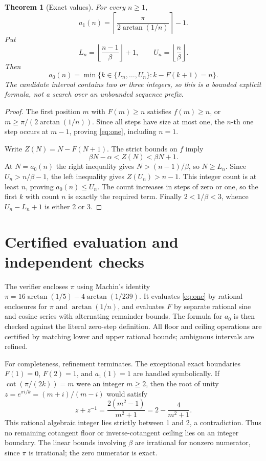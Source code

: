\documentclass[10pt]{article}
\newtheorem{theorem}{Theorem}
\begin{document}
\begin{theorem}[Exact values]\label{thm:exact}
For every $n\ge1$,
\begin{equation}\label{eq:one}
 a_1(n)=\left\lceil\frac\pi{2\arctan(1/n)}\right\rceil-1.
\end{equation}
Put
\[
 L_n=\left\lfloor\frac{n-1}{\beta}\right\rfloor+1,\qquad
 U_n=\left\lfloor\frac n\beta\right\rfloor.
\]
Then
\begin{equation}\label{eq:zero}
 a_0(n)=\min\{k\in\{L_n,\ldots,U_n\}:k-F(k+1)=n\}.
\end{equation}
The candidate interval contains two or three integers, so this is a bounded
explicit formula, not a search over an unbounded sequence prefix.
\end{theorem}
\begin{proof}
The first position $m$ with $F(m)\ge n$ satisfies
$f(m)\ge n$, or $m\ge\pi/(2\arctan(1/n))$.
Since all steps have size at most one, the $n$-th one step occurs at
$m-1$, proving \eqref{eq:one}, including $n=1$.

Write $Z(N)=N-F(N+1)$. The strict bounds on $f$ imply
\[
 \beta N-\alpha<Z(N)<\beta N+1.
\]
At $N=a_0(n)$ the right inequality gives $N>(n-1)/\beta$, so
$N\ge L_n$. Since $U_n>n/\beta-1$, the left inequality gives
$Z(U_n)>n-1$. This integer count is at least $n$, proving $a_0(n)\le U_n$.
The count increases in steps of zero or one, so the first $k$ with count $n$
is exactly the required term. Finally $2<1/\beta<3$, whence
$U_n-L_n+1$ is either 2 or 3.
\end{proof}

\section{Certified evaluation and independent checks}
The verifier encloses $\pi$ using Machin's identity
$\pi=16\arctan(1/5)-4\arctan(1/239)$. It evaluates \eqref{eq:one}
by rational enclosures for $\pi$ and $\arctan(1/n)$, and evaluates $F$
by separate rational sine and cosine
series with alternating remainder bounds. The formula for $a_0$ is then
checked against the literal zero-step definition. All floor and ceiling
operations are certified by matching lower and upper rational bounds;
ambiguous intervals are refined.

For completeness, refinement terminates. The exceptional exact boundaries
$F(1)=0$, $F(2)=1$, and $a_1(1)=1$ are handled symbolically. If
$\cot(\pi/(2k))=m$ were an integer $m\ge2$, then the root of unity
$z=e^{\pi i/k}=(m+i)/(m-i)$ would satisfy
\[
 z+z^{-1}=\frac{2(m^2-1)}{m^2+1}=2-\frac4{m^2+1}.
\]
This rational algebraic integer lies strictly between 1 and 2, a contradiction.
Thus no remaining cotangent floor or inverse-cotangent ceiling lies on an
integer boundary. The linear bounds involving $\beta$ are irrational for
nonzero numerator, since $\pi$ is irrational; the zero numerator is exact.
\end{document}
